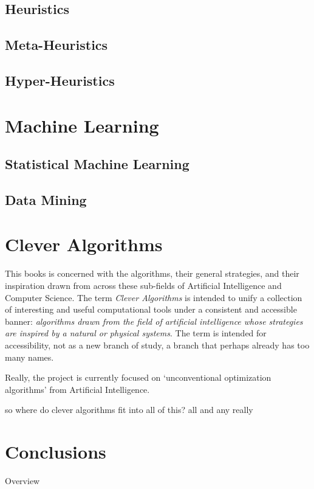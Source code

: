 \documentclass[a4paper, 11pt]{article}
\begin{document}
\subsection{Heuristics}

\subsection{Meta-Heuristics}

\subsection{Hyper-Heuristics}


% 
% 
\section{Machine Learning}
\label{sec:machine_learning}

\subsection{Statistical Machine Learning}

\subsection{Data Mining}

% 
% 
\section{Clever Algorithms}
\label{sec:clever_algorithms}
This books is concerned with the algorithms, their general strategies, and their inspiration drawn from across these sub-fields of Artificial Intelligence and Computer Science. The term \emph{Clever Algorithms} is intended to unify a collection of interesting and useful computational tools under a consistent and accessible banner: \emph{algorithms drawn from the field of artificial intelligence whose strategies are inspired by a natural or physical systems}. The term is intended for accessibility, not as a new branch of study, a branch that perhaps already has too many names.

Really, the project is currently focused on `unconventional optimization algorithms' from Artificial Intelligence.

so where do clever algorithms fit into all of this?
all and any really


\section{Conclusions}
\label{sec:conclusions}
Overview





\end{document}
